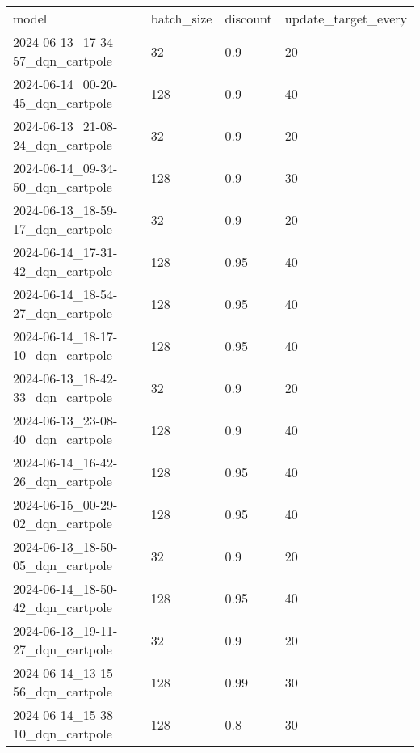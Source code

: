 \documentclass[a4paper,12pt]{article}
\begin{document}
\begin{center}
    \resizebox{\textwidth}{!} {
        \begin{tabular}{llll}
            model                               & batch\_size & discount & update\_target\_every \\
            2024-06-13\_17-34-57\_dqn\_cartpole & 32          & 0.9      & 20                    \\
            2024-06-14\_00-20-45\_dqn\_cartpole & 128         & 0.9      & 40                    \\
            2024-06-13\_21-08-24\_dqn\_cartpole & 32          & 0.9      & 20                    \\
            2024-06-14\_09-34-50\_dqn\_cartpole & 128         & 0.9      & 30                    \\
            2024-06-13\_18-59-17\_dqn\_cartpole & 32          & 0.9      & 20                    \\
            2024-06-14\_17-31-42\_dqn\_cartpole & 128         & 0.95     & 40                    \\
            2024-06-14\_18-54-27\_dqn\_cartpole & 128         & 0.95     & 40                    \\
            2024-06-14\_18-17-10\_dqn\_cartpole & 128         & 0.95     & 40                    \\
            2024-06-13\_18-42-33\_dqn\_cartpole & 32          & 0.9      & 20                    \\
            2024-06-13\_23-08-40\_dqn\_cartpole & 128         & 0.9      & 40                    \\
            2024-06-14\_16-42-26\_dqn\_cartpole & 128         & 0.95     & 40                    \\
            2024-06-15\_00-29-02\_dqn\_cartpole & 128         & 0.95     & 40                    \\
            2024-06-13\_18-50-05\_dqn\_cartpole & 32          & 0.9      & 20                    \\
            2024-06-14\_18-50-42\_dqn\_cartpole & 128         & 0.95     & 40                    \\
            2024-06-13\_19-11-27\_dqn\_cartpole & 32          & 0.9      & 20                    \\
            2024-06-14\_13-15-56\_dqn\_cartpole & 128         & 0.99     & 30                    \\
            2024-06-14\_15-38-10\_dqn\_cartpole & 128         & 0.8      & 30                    \\

\end{tabular}}
\end{center}
\end{document}
